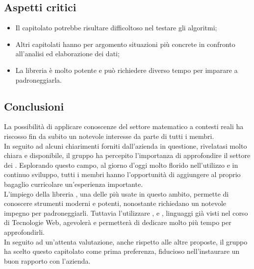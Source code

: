 \subsection{Aspetti critici}
\begin{itemize}
\item Il capitolato potrebbe risultare difficoltoso nel testare gli algoritmi;
\item Altri capitolati hanno per argomento situazioni più concrete in confronto all'analisi ed elaborazione dei dati;
\item La libreria  è molto potente e può richiedere diverso tempo per imparare a padroneggiarla. 
\end{itemize}

\subsection{Conclusioni}
La possibilità di applicare conoscenze del settore matematico a contesti reali ha riscosso fin da subito un notevole interesse da parte di tutti i membri.\\ In seguito ad alcuni chiarimenti forniti dall'azienda in questione, rivelatasi molto chiara e disponibile, il gruppo ha percepito l'importanza di approfondire il settore dei . Esplorando questo campo, al giorno d'oggi molto florido nell'utilizzo e in continuo sviluppo, tutti i membri hanno l'opportunità di aggiungere al proprio bagaglio curricolare un'esperienza importante.\\
L'impiego della libreria , una delle più usate in questo ambito, permette di conoscere strumenti moderni e potenti, nonostante richiedano un notevole impegno per padroneggiarli. Tuttavia l'utilizzare ,  e , linguaggi già visti nel corso di Tecnologie Web, agevolerà e permetterà di dedicare molto più tempo per approfondirli.\\In seguito ad un'attenta valutazione, anche rispetto alle altre proposte, il gruppo ha scelto questo capitolato come prima preferenza, fiducioso nell'instaurare un buon rapporto con l'azienda.
